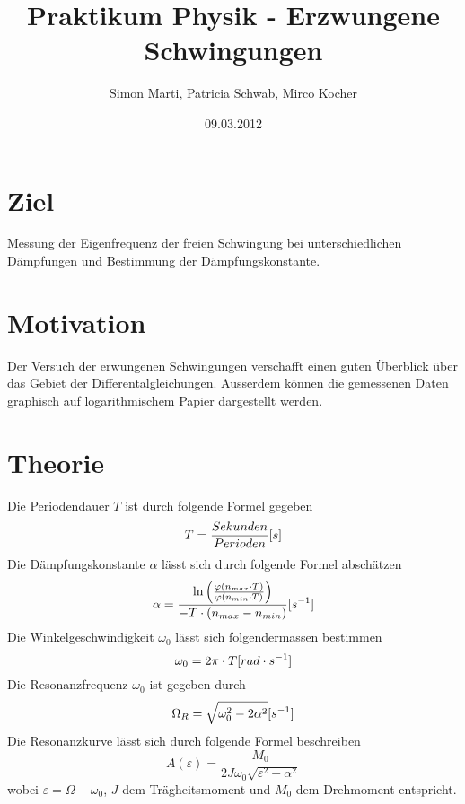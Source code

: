 \documentclass[12pt,a4paper]{article}
\title{Praktikum Physik - Erzwungene Schwingungen}
\author{Simon Marti, Patricia Schwab, Mirco Kocher}
\date{09.03.2012}
\begin{document}
\maketitle

\section*{Ziel}
Messung der Eigenfrequenz der freien Schwingung bei unterschiedlichen D\"ampfungen und Bestimmung der D\"ampfungskonstante.

\section*{Motivation}
Der Versuch der erwungenen Schwingungen verschafft einen guten \"Uberblick \"uber das Gebiet der Differentalgleichungen. Ausserdem k\"onnen die gemessenen Daten graphisch auf logarithmischem Papier dargestellt werden. 

\section*{Theorie}
Die Periodendauer $T$ ist durch folgende Formel gegeben
\begin{equation}
T = \frac{Sekunden}{Perioden} \mbox [{s}]
\end{equation}
Die D\"ampfungskonstante $\alpha$ l\"asst sich durch folgende Formel absch\"atzen
\begin{equation}
\alpha = \frac{\ln\left( \frac{\varphi(n_{max} \cdot T)}{\varphi(n_{min} \cdot T)}\right)}{-T\cdot (n_{max} - n_{min})} \mbox [{s}^{-1}]
\end{equation}
Die Winkelgeschwindigkeit $\omega_0$ l\"asst sich folgendermassen bestimmen
\begin{equation}
\omega_0 = 2\pi \cdot T \mbox[{rad \cdot s}^{-1}]
\end{equation}
Die Resonanzfrequenz $\omega_0$ ist gegeben durch
\begin{equation}
\Omega_R = \sqrt{\omega_0^2 - 2\alpha^2} \mbox [{s}^{-1}]
\end{equation}
Die Resonanzkurve l\"asst sich durch folgende Formel beschreiben
\begin{equation}
A(\varepsilon) = \frac{M_0}{2J\omega_0\sqrt{\varepsilon^2 + \alpha^2}}
\end{equation}
wobei $\varepsilon = \Omega - \omega_0$, $J$ dem Tr\"agheitsmoment und $M_0$ dem Drehmoment entspricht.
\end{document}
